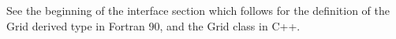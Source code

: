 

See the beginning of the interface section which
follows for the definition of the Grid derived type
in Fortran 90, and the Grid class in C++.


